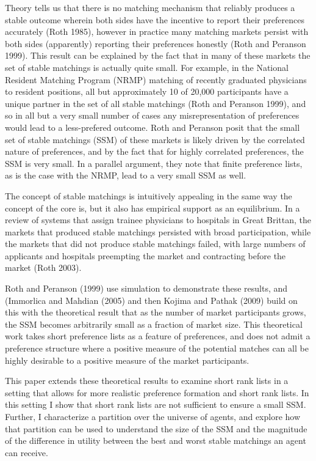 \documentclass[WP]{AEA}
\begin{document}
Theory tells us that there is no matching mechanism that reliably produces a stable outcome wherein both sides have the incentive to report their preferences accurately (Roth 1985), however in practice many matching markets persist with both sides (apparently) reporting their preferences honestly  (Roth and Peranson 1999).  This result can be explained by the fact that in many of these markets the set of stable matchings is actually quite small.  For example, in the National Resident Matching Program (NRMP) matching of recently graduated physicians to resident positions, all but approximately 10 of 20,000 participants have a unique partner in the set of all stable matchings (Roth and Peranson 1999), and so in all but a very small number of cases any misrepresentation of preferences would lead to a less-prefered outcome. Roth and Peranson posit that the small set of stable matchings (SSM) of these markets is likely driven by the correlated nature of preferences, and by the fact that for highly correlated preferences, the SSM is very small.  In a parallel argument,  they note that finite preference lists, as is the case with the NRMP, lead to a very small SSM as well.  

The concept of stable matchings is intuitively appealing in the same way the concept of the core is, but it also has empirical support as an equilibrium. In a review of systems that assign trainee physicians to hospitals in Great Brittan, the markets that produced stable matchings persisted with broad participation, while the markets that did not produce stable matchings failed, with large numbers of applicants and hospitals preempting the market and contracting before the market (Roth 2003).


Roth and Peranson (1999) use simulation to demonstrate these results, and (Immorlica and Mahdian (2005) and then Kojima and Pathak (2009) build on this with the theoretical result that as the number of market participants grows, the SSM becomes arbitrarily small as a fraction of market size. This theoretical work takes short preference lists as a feature of preferences, and does not admit a preference structure where a positive measure of the potential matches can all be highly desirable to a positive measure of the market participants. 

This paper extends these theoretical results to examine short rank lists in a setting that allows for more realistic preference formation and short rank lists. In this setting I show that short rank lists are not sufficient to ensure a small SSM.  Further, I characterize a partition over the universe of agents, and explore how that partition can be used to understand the size of the SSM and the magnitude of the difference in utility between the best and worst stable matchings an agent can receive.
\end{document}
